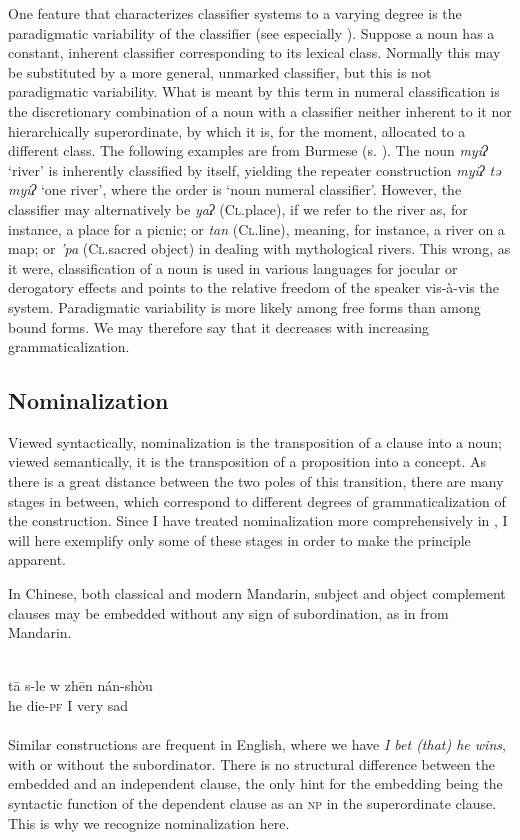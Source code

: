 \label{page65}One feature that characterizes classifier systems to a varying degree is the paradigmatic variability of the classifier (see especially \citealt{Serzisko1982}). Suppose a noun has a constant, inherent classifier corresponding to its lexical class. Normally this may be substituted by a more general, unmarked classifier, but this is not paradigmatic variability. What is meant by this term in numeral classification is the discretionary combination of a noun with a classifier neither inherent to it nor hierarchically superordinate, by which it is, for the moment, allocated to a different class. The following examples are from Burmese (s. \citealt[20]{Serzisko1980}). The noun \textit{myiʔ} ‘river’ is inherently classified by itself, yielding the repeater construction \textit{myiʔ tə myiʔ} ‘one river’, where the order is ‘noun numeral classifier’. However, the classifier may alternatively be \textit{yaʔ} (\textsc{Cl}.place), if we refer to the river as, for instance, a place for a picnic; or \textit{tan} (\textsc{Cl}.line), meaning, for instance, a river on a map; or \textit{'pa} (\textsc{Cl}.sacred object) in dealing with mythological rivers. This wrong, as it were, classification of a noun is used in various languages for jocular or derogatory effects and points to the relative freedom of the speaker vis-à-vis the system. Paradigmatic variability is more likely among free forms than among bound forms. We may therefore say that it decreases with increasing grammaticalization.

\subsection{Nominalization} \label{sec:3.3.2}

Viewed syntactically, nominalization is the transposition of a clause into a noun; viewed semantically, it is the transposition of a proposition into a concept. As there is a great distance between the two poles of this transition, there are many stages in between, which correspond to different degrees of grammaticalization of the construction. Since I have treated nominalization more comprehensively in \citealt{Lehmann1982a}, I will here exemplify only some of these stages in order to make the principle apparent.

In Chinese, both classical and modern Mandarin, subject and object complement clauses may be embedded without any sign of subordination, as in  from Mandarin.

\ea\label{ex:E25}
\\
\gll   t\=a  s-le  w  zh\=en  nán-shòu\\
 he  die-\textsc{pf}  I  very  sad\\
\\
\z
\noindent Similar constructions are frequent in English, where we have \textit{I bet (that) he wins}, with or without the subordinator. There is no structural difference between the embedded and an independent clause, the only hint for the embedding being the syntactic function of the dependent clause as an \textsc{np} in the superordinate clause. This is why we recognize nominalization here.

